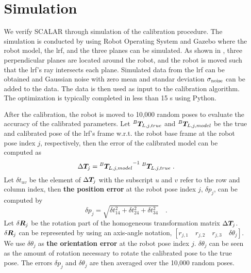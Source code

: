 \section{Simulation}
\label{sec:simulation}

We verify SCALAR through simulation of the calibration procedure. The simulation is conducted by using Robot Operating System and Gazebo where the robot model, the \ac{lrf}, and the three planes can be simulated.  
As shown in , three perpendicular planes are located around the robot, and the robot is moved such that the \ac{lrf}'s ray intersects each plane. Simulated data from the \ac{lrf} can be obtained and Gaussian noise with zero mean and standar deviation $\sigma_{\rm{noise}}$ can be added to the data. The data is then used as input to the calibration algorithm. The optimization is typically completed in less than 15 s using Python.

After the calibration, the robot is moved to 10,000 random poses to evaluate the accuracy of the calibrated parameters. Let ${^B}\vb*{T}_{L,j,true}$ and ${^B}\vb*{T}_{L,j,model}$ be the true and calibrated pose of the \ac{lrf}'s frame w.r.t. the robot base frame at the robot pose index $j$, respectively, then the error of the calibrated model can be computed as 
\begin{equation}
\Delta \vb*{T}_j =  {{^B}\vb*{T}_{L,j,model}}^{-1} \; {^B}\vb*{T}_{L,j,true} \; .
\end{equation}
Let $\delta t_{uv}$ be the element of $\Delta \vb*{T}_j$ with the subscript $u$ and $v$ refer to the row and column index, then \textbf{the position error} at the robot pose index $j$, $\delta p_j$, can be computed by
\begin{equation}
\delta p_j = \sqrt{\delta t_{14}^2 + \delta t_{24}^2 + \delta t_{34}^2} \quad .
\end{equation}
Let $\delta \vb*{R}_j$ be the rotation part of the homogeneous transformation matrix $\Delta \vb*{T}_j$. $\delta \vb*{R}_j$ can be represented by using an axis-angle notation, $[r_{j,1}\quad r_{j,2}\quad r_{j,3}\quad \delta \theta_j]$. We use $\delta\theta_j$ as \textbf{the orientation error} at the robot pose index $j$.  $\delta\theta_j$ can be seen as the amount of rotation necessary to rotate the calibrated pose to the true pose. The errors $\delta p_j$ and $\delta\theta_j$ are then averaged over the 10,000 random poses.


